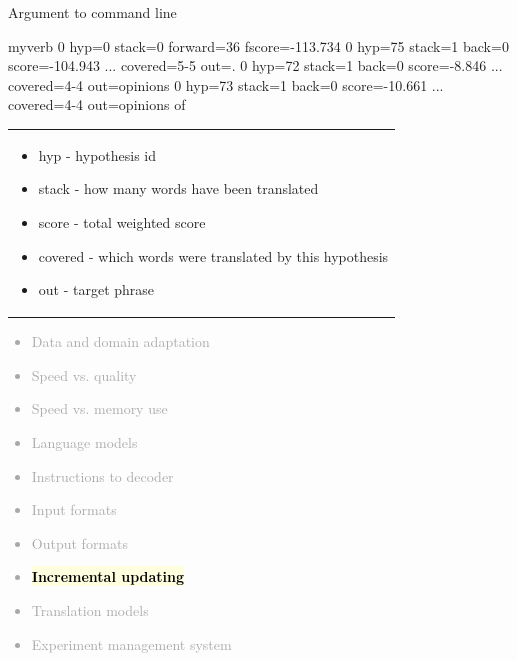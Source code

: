 \documentclass[landscape]{uedslides2C}
\newcommand{\currenttopic}[1]{\colorbox{lightyellow}{\textcolor{black}{\bf #1}}}
\begin{document}
\begin{center}
Argument to command line\\[2mm]
{\small \begin{SaveVerbatim}{myverb}
0 hyp=0 stack=0 forward=36 fscore=-113.734
0 hyp=75 stack=1 back=0 score=-104.943 ... covered=5-5 out=.
0 hyp=72 stack=1 back=0 score=-8.846 ... covered=4-4 out=opinions
0 hyp=73 stack=1 back=0 score=-10.661 ... covered=4-4 out=opinions of
\end{SaveVerbatim}
\colorbox{gray}{}

\vspace{-10mm}
\begin{tabular}{p{15cm}}
\begin{itemize} \itemsep -2mm
\item hyp - hypothesis id
\item  stack - how many words have been translated
\item score - total weighted score
\item covered - which words were translated by this hypothesis
\item out - target phrase
\end{itemize}
\end{tabular}}
\end{center}


\vspace{-5mm}
\textcolor{darkgrey}{
\begin{itemize} \itemsep -1mm
\item Data and domain adaptation
\item Speed vs. quality
\item Speed vs. memory use
\item Language models
\item Instructions to decoder
\item Input formats
\item Output formats
\item \currenttopic{Incremental updating}
\item Translation models
\item Experiment management system
\end{itemize}
}

\end{document}
